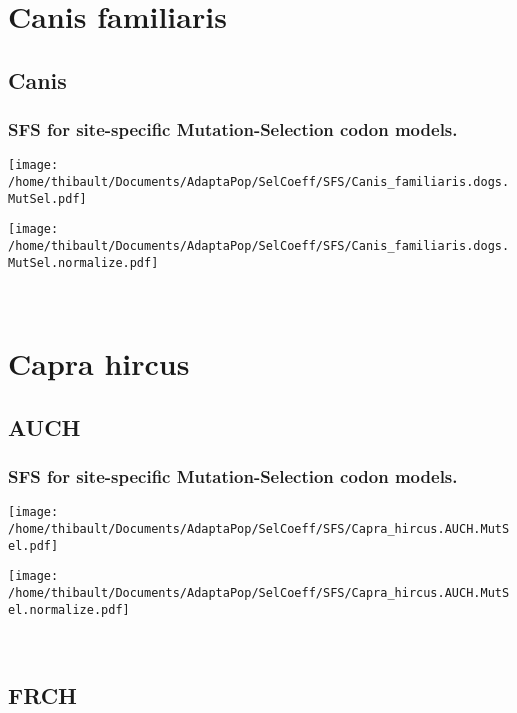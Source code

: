 \section{Canis familiaris} 
 
\subsection{Canis} 
 
\subsubsection*{SFS for site-specific Mutation-Selection codon models.} 
\begin{minipage}{0.49\linewidth} 
\texttt{[image: /home/thibault/Documents/AdaptaPop/SelCoeff/SFS/Canis\_familiaris.dogs.MutSel.pdf]} 
\end{minipage}
\begin{minipage}{0.49\linewidth}
\texttt{[image: /home/thibault/Documents/AdaptaPop/SelCoeff/SFS/Canis\_familiaris.dogs.MutSel.normalize.pdf]} 
\end{minipage}
\\ 
\section{Capra hircus} 
 
\subsection{AUCH} 
 
\subsubsection*{SFS for site-specific Mutation-Selection codon models.} 
\begin{minipage}{0.49\linewidth} 
\texttt{[image: /home/thibault/Documents/AdaptaPop/SelCoeff/SFS/Capra\_hircus.AUCH.MutSel.pdf]} 
\end{minipage}
\begin{minipage}{0.49\linewidth}
\texttt{[image: /home/thibault/Documents/AdaptaPop/SelCoeff/SFS/Capra\_hircus.AUCH.MutSel.normalize.pdf]} 
\end{minipage}
\\ 
\subsection{FRCH} 
 

